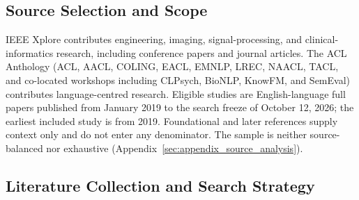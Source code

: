 \documentclass[11pt]{article}
\theoremstyle{plain}
\theoremstyle{definition}
\theoremstyle{remark}
\begin{document}
\subsection{Source Selection and Scope}
\label{sec:appendix_sources}
IEEE Xplore contributes engineering, imaging, signal-processing, and clinical-informatics research, including conference papers and journal articles. The ACL Anthology (ACL, AACL, COLING, EACL, EMNLP, LREC, NAACL, TACL, and co-located workshops including CLPsych, BioNLP, KnowFM, and SemEval) contributes language-centred research. Eligible studies are English-language full papers published from January 2019 to the search freeze of October 12, 2026; the earliest included study is from 2019. Foundational and later references supply context only and do not enter any denominator. The sample is neither source-balanced nor exhaustive (Appendix~\ref{sec:appendix_source_analysis}).

\subsection{Literature Collection and Search Strategy}
\label{sec:appendix_collection}
\end{document}
